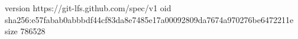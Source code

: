 version https://git-lfs.github.com/spec/v1
oid sha256:e57fabab0abbbdf44cf83da8e7485e17a00092809da7674a970276be6472211e
size 786528
